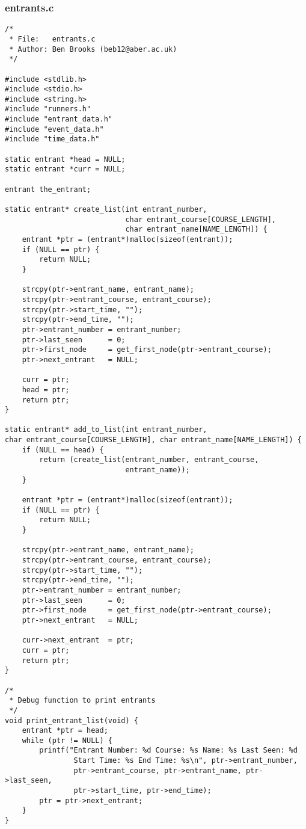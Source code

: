 \documentclass[pdftex,12pt,a4paper]{article}
\begin{document}
\subsubsection{entrants.c}
\begin{verbatim}
/*
 * File:   entrants.c
 * Author: Ben Brooks (beb12@aber.ac.uk)
 */

#include <stdlib.h>
#include <stdio.h>
#include <string.h>
#include "runners.h"
#include "entrant_data.h"
#include "event_data.h"
#include "time_data.h"

static entrant *head = NULL;
static entrant *curr = NULL;

entrant the_entrant;

static entrant* create_list(int entrant_number,
							char entrant_course[COURSE_LENGTH],
							char entrant_name[NAME_LENGTH]) {
    entrant *ptr = (entrant*)malloc(sizeof(entrant));
    if (NULL == ptr) {
        return NULL;
    }

    strcpy(ptr->entrant_name, entrant_name);
    strcpy(ptr->entrant_course, entrant_course);
    strcpy(ptr->start_time, "");
    strcpy(ptr->end_time, "");
    ptr->entrant_number = entrant_number;
    ptr->last_seen      = 0;
    ptr->first_node     = get_first_node(ptr->entrant_course);
    ptr->next_entrant   = NULL;

    curr = ptr;
    head = ptr;
    return ptr;
}

static entrant* add_to_list(int entrant_number,
char entrant_course[COURSE_LENGTH], char entrant_name[NAME_LENGTH]) {
    if (NULL == head) {
        return (create_list(entrant_number, entrant_course,
        					entrant_name));
    }

    entrant *ptr = (entrant*)malloc(sizeof(entrant));
    if (NULL == ptr) {
        return NULL;
    }

    strcpy(ptr->entrant_name, entrant_name);
    strcpy(ptr->entrant_course, entrant_course);
    strcpy(ptr->start_time, "");
    strcpy(ptr->end_time, "");
    ptr->entrant_number = entrant_number;
    ptr->last_seen      = 0;
    ptr->first_node     = get_first_node(ptr->entrant_course);
    ptr->next_entrant   = NULL;

    curr->next_entrant  = ptr;
    curr = ptr;
    return ptr;
}

/*
 * Debug function to print entrants
 */
void print_entrant_list(void) {
    entrant *ptr = head;
    while (ptr != NULL) {
        printf("Entrant Number: %d Course: %s Name: %s Last Seen: %d
        		Start Time: %s End Time: %s\n", ptr->entrant_number,
        		ptr->entrant_course, ptr->entrant_name, ptr->last_seen,
        		ptr->start_time, ptr->end_time);
        ptr = ptr->next_entrant;
    }
}


\end{verbatim}
\end{document}
